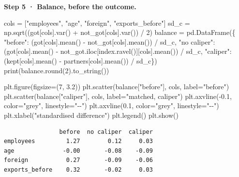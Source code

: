 \documentclass[
  letterpaper,
  10pt,
  twoside,
  openright,
  numbers=noenddot,
  chapterprefix=true]{scrbook}
\newenvironment{Shaded}{}{}
\newcommand{\BuiltInTok}[1]{\textcolor[rgb]{0.84,0.23,0.29}{#1}}
\newcommand{\DecValTok}[1]{\textcolor[rgb]{0.00,0.36,0.77}{#1}}
\newcommand{\FloatTok}[1]{\textcolor[rgb]{0.00,0.36,0.77}{#1}}
\newcommand{\NormalTok}[1]{\textcolor[rgb]{0.14,0.16,0.18}{#1}}
\newcommand{\OperatorTok}[1]{\textcolor[rgb]{0.14,0.16,0.18}{#1}}
\newcommand{\StringTok}[1]{\textcolor[rgb]{0.01,0.18,0.38}{#1}}
\begin{document}
\textbf{Step 5 · Balance, before the outcome.}

\begin{Shaded}
\begin{Highlighting}[]
\NormalTok{cols }\OperatorTok{=}\NormalTok{ [}\StringTok{"employees"}\NormalTok{, }\StringTok{"age"}\NormalTok{, }\StringTok{"foreign"}\NormalTok{, }\StringTok{"exports\_before"}\NormalTok{]}
\NormalTok{sd\_c }\OperatorTok{=}\NormalTok{ np.sqrt((got[cols].var() }\OperatorTok{+}\NormalTok{ not\_got[cols].var()) }\OperatorTok{/} \DecValTok{2}\NormalTok{)}
\NormalTok{balance }\OperatorTok{=}\NormalTok{ pd.DataFrame(\{}
    \StringTok{"before"}\NormalTok{: (got[cols].mean() }\OperatorTok{{-}}\NormalTok{ not\_got[cols].mean()) }\OperatorTok{/}\NormalTok{ sd\_c,}
    \StringTok{"no caliper"}\NormalTok{: (got[cols].mean() }\OperatorTok{{-}}\NormalTok{ not\_got.iloc[index.ravel()][cols].mean()) }\OperatorTok{/}\NormalTok{ sd\_c,}
    \StringTok{"caliper"}\NormalTok{: (kept[cols].mean() }\OperatorTok{{-}}\NormalTok{ partners[cols].mean()) }\OperatorTok{/}\NormalTok{ sd\_c\})}
\BuiltInTok{print}\NormalTok{(balance.}\BuiltInTok{round}\NormalTok{(}\DecValTok{2}\NormalTok{).to\_string())}

\NormalTok{plt.figure(figsize}\OperatorTok{=}\NormalTok{(}\DecValTok{7}\NormalTok{, }\FloatTok{3.2}\NormalTok{))}
\NormalTok{plt.scatter(balance[}\StringTok{"before"}\NormalTok{], cols, label}\OperatorTok{=}\StringTok{"before"}\NormalTok{)}
\NormalTok{plt.scatter(balance[}\StringTok{"caliper"}\NormalTok{], cols, label}\OperatorTok{=}\StringTok{"matched, caliper"}\NormalTok{)}
\NormalTok{plt.axvline(}\OperatorTok{{-}}\FloatTok{0.1}\NormalTok{, color}\OperatorTok{=}\StringTok{"grey"}\NormalTok{, linestyle}\OperatorTok{=}\StringTok{"{-}{-}"}\NormalTok{)}
\NormalTok{plt.axvline(}\FloatTok{0.1}\NormalTok{, color}\OperatorTok{=}\StringTok{"grey"}\NormalTok{, linestyle}\OperatorTok{=}\StringTok{"{-}{-}"}\NormalTok{)}
\NormalTok{plt.xlabel(}\StringTok{"standardised difference"}\NormalTok{)}
\NormalTok{plt.legend()}
\NormalTok{plt.show()}
\end{Highlighting}
\end{Shaded}

\begin{verbatim}
                before  no caliper  caliper
employees         1.27        0.12     0.03
age              -0.00       -0.08    -0.09
foreign           0.27       -0.09    -0.06
exports_before    0.32       -0.02     0.03
\end{verbatim}
\end{document}
